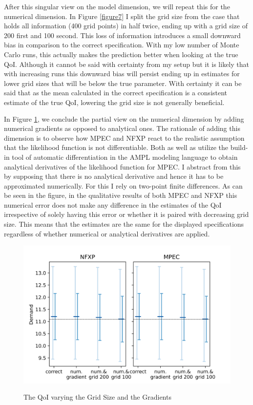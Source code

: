 After this singular view on the model dimension, we will repeat this for the numerical dimension. In Figure \ref{figure7} I split the grid size from the case that holds all information (400 grid points) in half twice, ending up with a grid size of 200 first and 100 second. This loss of information introduces a small downward bias in comparison to the correct specification. With my low number of Monte Carlo runs, this actually makes the prediction better when looking at the true QoI. Although it cannot be said with certainty from my setup but it is likely that with increasing runs this downward bias will persist ending up in estimates for lower grid sizes that will be below the true parameter. With certainty it can be said that as the mean calculated in the correct specification is a consistent estimate of the true QoI, lowering the grid size is not generally beneficial.

In Figure \ref{figure8}, we conclude the partial view on the numerical dimension by adding numerical gradients as opposed to analytical ones. The rationale of adding this dimension is to observe how MPEC and NFXP react to the realistic assumption that the likelihood function is not differentiable. Both \cite{Su.Judd.2012} as well as \cite{Iskhakov.2016} utilize the build-in tool of automatic differentiation in the AMPL modeling language to obtain analytical derivatives of the likelihood function for MPEC. I abstract from this by supposing that there is no analytical derivative and hence it has to be approximated numerically. For this I rely on two-point finite differences. As can be seen in the figure, in the qualitative results of both MPEC and NFXP this numerical error does not make any difference in the estimates of the QoI irrespective of solely having this error or whether it is paired with decreasing grid size. This means that the estimates are the same for the displayed specifications regardless of whether numerical or analytical derivatives are applied.

\begin{figure}[!b]
	\caption{The QoI varying the Grid Size and the Gradients}
	\vspace*{-4mm}
	\centering
	\includegraphics[scale=0.9]{../figures/figure_8.png}
	\label{figure8}
\end{figure}


